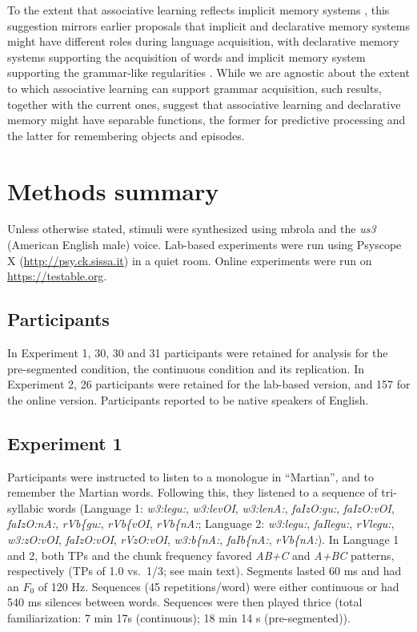 \documentclass[]{article}
\begin{document}
To the extent that associative learning reflects implicit memory systems \citep{Christiansen2018}, this suggestion mirrors earlier proposals that implicit and declarative memory systems might have different roles during language acquisition, with declarative memory systems supporting the acquisition of words and implicit memory system supporting the grammar-like regularities \citep{Ullman2001,Pinker2002a}. While we are agnostic about the extent to which associative learning can support grammar acquisition, such results, together with the current ones, suggest that associative learning and declarative memory might have separable functions, the former for predictive processing and the latter for remembering objects and episodes.

\clearpage

\section{Methods summary}

Unless otherwise stated, stimuli were synthesized using mbrola \citep{mbrola} and the \emph{us3} (American English male) voice. Lab-based experiments were run using Psyscope X (\url{http://psy.ck.sissa.it}) in a quiet room. Online experiments were run on \url{https://testable.org}.

\subsection{Participants}\label{participants}

In Experiment 1, 30, 30 and 31 participants were retained for analysis for the pre-segmented condition, the continuous condition and its replication. In Experiment 2, 26 participants were retained for the lab-based version, and 157 for the online version. Participants reported to be native speakers of English.

\subsection{Experiment 1}

Participants were instructed to listen to a monologue in ``Martian'', and to remember the Martian words. Following this, they listened to a sequence of tri-syllabic words (Language 1: \emph{w3:legu:}, \emph{w3:levOI}, \emph{w3:lenA:}, \emph{faIzO:gu:}, \emph{faIzO:vOI}, \emph{faIzO:nA:}, \emph{rVb\{gu:}, \emph{rVb\{vOI}, \emph{rVb\{nA:}; Language 2: \emph{w3:legu:}, \emph{faIlegu:}, \emph{rVlegu:}, \emph{w3:zO:vOI}, \emph{faIzO:vOI}, \emph{rVzO:vOI}, \emph{w3:b\{nA:}, \emph{faIb\{nA:}, \emph{rVb\{nA:}). In Language 1 and 2, both TPs and the chunk frequency favored \emph{AB+C} and \emph{A+BC} patterns, respectively (TPs of 1.0 vs.~1/3; see main text). Segments lasted 60 ms and had an \(F_0\) of 120 Hz. Sequences (45 repetitions/word) were either continuous or had 540 ms silences between words. Sequences were then played thrice (total familiarization: 7 min 17s (continuous); 18 min 14 s (pre-segmented)).
\end{document}
